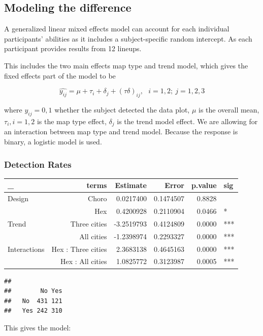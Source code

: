 \documentclass[conference,final,]{IEEEtran}
\begin{document}
\hypertarget{modeling-the-difference}{%
\subsection{Modeling the difference}\label{modeling-the-difference}}

A generalized linear mixed effects model can account for each individual
participants' abilities as it includes a subject-specific random
intercept. As each participant provides results from 12 lineups.

This includes the two main effects map type and trend model, which gives
the fixed effects part of the model to be

\[\widehat{y_{ij}} = \mu + \tau_i + \delta_j + (\tau\delta)_{ij}, ~~~ i=1,2; ~j=1,2,3\]

where \(y_{ij} = 0, 1\) whether the subject detected the data plot,
\(\mu\) is the overall mean, \(\tau_i, i=1,2\) is the map type effect,
\(\delta_j\) is the trend model effect. We are allowing for an
interaction between map type and trend model. Because the response is
binary, a logistic model is used.

\hypertarget{detection-rates}{%
\subsubsection{Detection Rates}\label{detection-rates}}

\begin{tabular}{l|r|r|r|r|l}
\hline
\_ & terms & Estimate & Error & p.value & sig\\
\hline
Design & Choro & 0.0217400 & 0.1474507 & 0.8828 & \\
\hline
 & Hex & 0.4200928 & 0.2110904 & 0.0466 & *\\
\hline
Trend & Three cities & -3.2519793 & 0.4124809 & 0.0000 & ***\\
\hline
 & All cities & -1.2398974 & 0.2293327 & 0.0000 & ***\\
\hline
Interactions & Hex : Three cities & 2.3683138 & 0.4645163 & 0.0000 & ***\\
\hline
 & Hex : All cities & 1.0825772 & 0.3123987 & 0.0005 & ***\\
\hline
\end{tabular}

\begin{verbatim}
##      
##        No Yes
##   No  431 121
##   Yes 242 310
\end{verbatim}

This gives the model:
\end{document}
